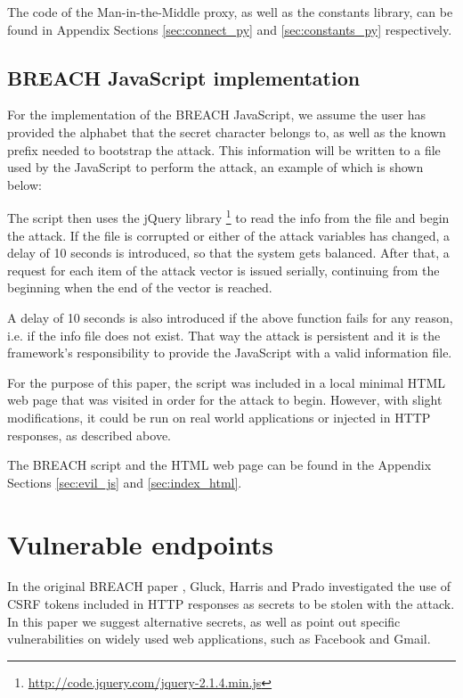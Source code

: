 The code of the Man-in-the-Middle proxy, as well as the constants library, can
be found in Appendix Sections \ref{sec:connect_py} and \ref{sec:constants_py}
respectively.

\subsection{BREACH JavaScript implementation}

For the implementation of the BREACH JavaScript, we assume the user has provided
the alphabet that the secret character belongs to, as well as the known prefix
needed to bootstrap the attack. This information will be written to a file used
by the JavaScript to perform the attack, an example of which is shown below:


The script then uses the jQuery library
\footnote{\url{http://code.jquery.com/jquery-2.1.4.min.js}} to read the info
from the file and begin the attack. If the file is corrupted or either of the
attack variables has changed, a delay of 10 seconds is introduced, so that the
system gets balanced. After that, a request for each item of the attack vector
is issued serially, continuing from the beginning when the end of the vector is
reached.

A delay of 10 seconds is also introduced if the above function fails for any
reason, i.e. if the info file does not exist. That way the attack is persistent
and it is the framework's responsibility to provide the JavaScript with a valid
information file.

For the purpose of this paper, the script was included in a local minimal HTML
web page that was visited in order for the attack to begin. However, with slight
modifications, it could be run on real world applications or injected in HTTP
responses, as described above.

The BREACH script and the HTML web page can be found in the Appendix Sections
\ref{sec:evil_js} and \ref{sec:index_html}.

\section{Vulnerable endpoints}\label{sec:vulnerabilities}

In the original BREACH paper \cite{breach}, Gluck, Harris and Prado investigated
the use of CSRF tokens included in HTTP responses as secrets to be stolen with
the attack. In this paper we suggest alternative secrets, as well as point out
specific vulnerabilities on widely used web applications, such as Facebook and
Gmail.

